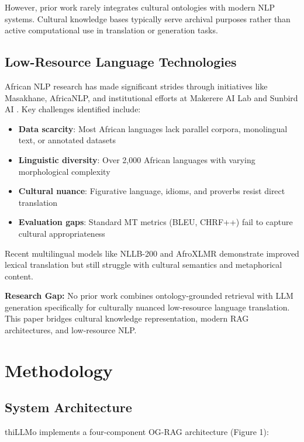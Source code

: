 \documentclass[a4paper,11pt]{article}
\begin{document}
However, prior work rarely integrates cultural ontologies with modern NLP systems. Cultural knowledge bases typically serve archival purposes rather than active computational use in translation or generation tasks.

\subsection{Low-Resource Language Technologies}

African NLP research has made significant strides through initiatives like Masakhane, AfricaNLP, and institutional efforts at Makerere AI Lab and Sunbird AI \cite{orife2020masakhane}. Key challenges identified include:

\begin{itemize}
    \item \textbf{Data scarcity}: Most African languages lack parallel corpora, monolingual text, or annotated datasets
    \item \textbf{Linguistic diversity}: Over 2,000 African languages with varying morphological complexity
    \item \textbf{Cultural nuance}: Figurative language, idioms, and proverbs resist direct translation
    \item \textbf{Evaluation gaps}: Standard MT metrics (BLEU, CHRF++) fail to capture cultural appropriateness
\end{itemize}

Recent multilingual models like NLLB-200 \cite{costa2022no} and AfroXLMR demonstrate improved lexical translation but still struggle with cultural semantics and metaphorical content.

\textbf{Research Gap:} No prior work combines ontology-grounded retrieval with LLM generation specifically for culturally nuanced low-resource language translation. This paper bridges cultural knowledge representation, modern RAG architectures, and low-resource NLP.

\section{Methodology}

\subsection{System Architecture}

thiLLMo implements a four-component OG-RAG architecture (Figure 1):
\end{document}
